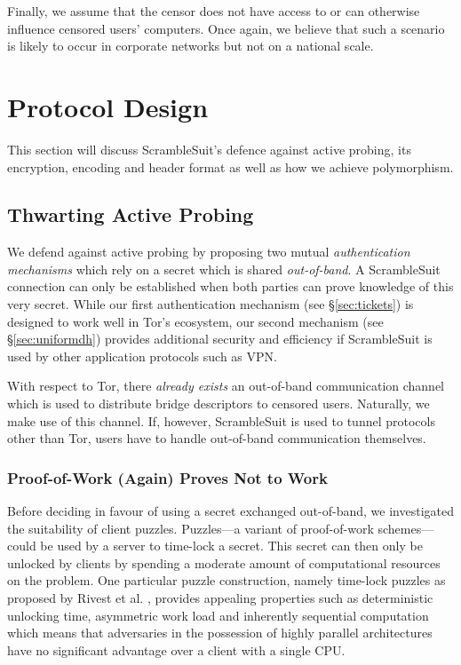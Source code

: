 \documentclass{sig-alternate}
\newcommand{\pt}{\textsf{ScrambleSuit}}
\numberwithin{enumi}{section}
\numberwithin{notesctr}{section}
\begin{document}
Finally, we assume that the censor does not have access to or can otherwise influence censored
users' computers. Once again, we believe that such a scenario is likely to occur in corporate
networks but not on a national scale.


\section{Protocol Design}
\label{sec:protocol_design}
This section will discuss \pt{}'s defence against active probing, its encryption, encoding and
header format as well as how we achieve polymorphism.

\subsection{Thwarting Active Probing}
\label{sec:thwarting}
We defend against active probing by proposing two mutual \emph{authentication mechanisms} which rely
on a secret which is shared \emph{out-of-band}. A \pt{} connection can only be established when both
parties can prove knowledge of this very secret. While our first authentication mechanism (see
\S \ref{sec:tickets}) is designed to work well in Tor's ecosystem, our second mechanism (see
\S \ref{sec:uniformdh}) provides additional security and efficiency if \pt{} is used by
other application protocols such as VPN.

With respect to Tor, there \emph{already exists} an out-of-band communication channel which is used
to distribute bridge descriptors to censored users. Naturally, we make use of this channel. If,
however, \pt{} is used to tunnel protocols other than Tor, users have to handle out-of-band
communication themselves.

\subsubsection{Proof-of-Work (Again) Proves Not to Work}
\label{sec:proof-of-work}
Before deciding in favour of using a secret exchanged out-of-band, we investigated the
suitability of client puzzles. Puzzles---a variant of proof-of-work schemes---could be used by a
server to time-lock a secret. This secret can then only be unlocked by clients by spending a
moderate amount of computational resources on the problem. One particular puzzle construction,
namely time-lock puzzles as proposed by Rivest et al. \cite{Rivest1996}, provides appealing
properties such as deterministic unlocking time, asymmetric work load and inherently sequential
computation which means that adversaries in the possession of highly parallel architectures have no
significant advantage over a client with a single CPU.
\end{document}
